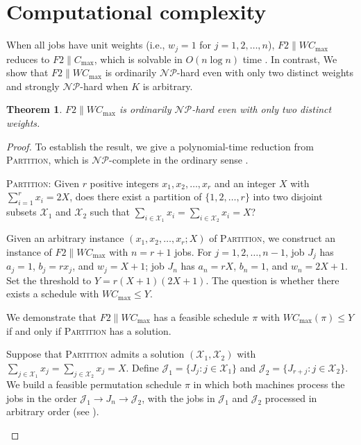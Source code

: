 ﻿\documentclass[12pt]{article}
\newtheorem{theorem}{Theorem}[section]
\let\origsection\section
\renewcommand{\section}{\FloatBarrier\origsection}
\begin{document}
\begin{sloppypar}
\section{Computational complexity}
\label{sec:complexity}

        When all jobs have unit weights (i.e., $w_j=1$ for $j=1, 2, \ldots, n$), $F2 \parallel WC_{\max}$ reduces to $F2 \parallel C_{\max}$, which is solvable in $O(n \log n)$ time \citep{johnson1954optimal}. In contrast, We show that $F2 \parallel WC_{\max}$ is ordinarily $\mathcal{NP}$-hard even with only two distinct weights and strongly $\mathcal{NP}$-hard when $K$ is arbitrary.
        
        \begin{theorem}\label{thm:nphard}
            $F2 \parallel WC_{\max}$ is ordinarily $\mathcal{NP}$-hard even with only two distinct weights.
        \end{theorem}
        \begin{proof}
            To establish the result, we give a polynomial-time reduction from \textsc{Partition}, which is $\mathcal{NP}$-complete in the ordinary sense \citep{garey1979computers}.
            
            \textsc{Partition}: Given $r$ positive integers $x_1, x_2, \ldots, x_r$ and an integer $X$ with
            $\sum_{i=1}^{r}x_i=2X$, does there exist a partition of $\{1, 2, \ldots, r\}$ into two disjoint subsets $\mathcal{X}_1$ and $\mathcal{X}_2$ such that $\sum_{i \in \mathcal{X}_1} x_i=\sum_{i\in \mathcal{X}_2} x_i=X$?
            
            Given an arbitrary instance $(x_1, x_2, \ldots, x_r; X)$ of \textsc{Partition}, we construct an instance of $F2 \parallel WC_{\max}$ with $n=r+1$ jobs. For $j=1, 2, \ldots, n-1$, job $J_j$ has $a_j=1$, $b_j=r x_j$, and $w_j=X+1$; job $J_n$ has $a_n=rX$, $b_n=1$, and $w_n=2X+1$. Set the threshold to $Y=r(X+1)(2X+1)$. The question is whether there exists a schedule with $W C_{\max} \leq Y$.
            
            We demonstrate that $F2 \parallel WC_{\max}$ has a feasible schedule $\pi$ with $W C_{\max}(\pi) \leq Y$ if and only if \textsc{Partition} has a solution.
            
            Suppose that \textsc{Partition} admits a solution $(\mathcal{X}_1, \mathcal{X}_2)$ with $\sum_{j \in \mathcal{X}_1} x_j = \sum_{j \in \mathcal{X}_2} x_j=X$. Define $\mathcal{J}_1=\{J_j: j \in \mathcal{X}_1\}$ and $\mathcal{J}_2=\{J_{r+j}: j \in \mathcal{X}_2\}$. We build a feasible permutation schedule $\pi$ in which both machines process the jobs in the order $\mathcal{J}_1 \to J_n \to \mathcal{J}_2$, with the jobs in $\mathcal{J}_1$ and $\mathcal{J}_2$ processed in arbitrary order (see ). 
            \begin{figure}[H]
                \centering
                \begin{tikzpicture}[x=0.15in, y=0.3in]
                    

\end{tikzpicture}
\end{figure}
\end{proof}
\end{sloppypar}
\end{document}
